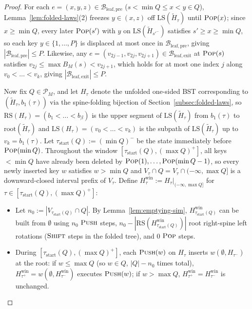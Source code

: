 \documentclass[11pt]{article}
\theoremstyle{definition}
\theoremstyle{remark}
\newcommand{\LS}{\mathrm{LS}}
\newcommand{\RS}{\mathrm{RS}}
\newcommand{\PUSH}{\textnormal{\scshape Push}}
\newcommand{\POP}{\textnormal{\scshape Pop}}
\newcommand{\SHIFT}{\textnormal{\scshape Shift}}
\begin{document}
\begin{proof}
For each $e = (x, y, z) \in \mathcal{B}_{\mathrm{leaf,pre}}$ ($s < \min Q \le x < y \in Q$), Lemma~\ref{lem:folded-laws}(2) freezes $y \in (x, z)$ off $\LS(\widetilde{H}_\tau)$ until $\POP(x)$; since $x \ge \min Q$, every later $\POP(s')$ with $y$ on $\LS(\widetilde{H}_{s'^-})$ satisfies $s' \ge x \ge \min Q$, so each key $y \in \{1, \dots, P\}$ is displaced at most once in $\mathcal{B}_{\mathrm{leaf,pre}}$, giving $|\mathcal{B}_{\mathrm{leaf,pre}}| \le P$. Likewise, any $e = (v_{2j-1}, v_{2j}, v_{2j+1}) \in \mathcal{B}_{\mathrm{leaf,exit}}$ at $\POP(s)$ satisfies $v_{2j} \le \max B_M(s) < v_{2j+1}$, which holds for at most one index $j$ along $v_0 < \dots < v_k$, giving $|\mathcal{B}_{\mathrm{leaf,exit}}| \le P$.

Now fix $Q \in \mathcal{P}_M$, and let $H_\tau$ denote the unfolded one-sided BST corresponding to $(\widetilde{H}_\tau, b_1(\tau))$ via the spine-folding bijection of Section~\ref{subsec:folded-laws}, so $\RS(H_\tau) = (b_1 < \dots < b_\beta)$ is the upper segment of $\LS(\widetilde{H}_\tau)$ from $b_1(\tau)$ to $\mathrm{root}(\widetilde{H}_\tau)$ and $\LS(H_\tau) = (v_0 < \dots < v_k)$ is the subpath of $\LS(\widetilde{H}_\tau)$ up to $v_k = b_1(\tau)$. Let $\tau_{\mathrm{start}}(Q) := (\min Q)^-$ be the state immediately before $\POP(\min Q)$. Throughout the window $[\tau_{\mathrm{start}}(Q), (\max Q)^+]$, all keys $< \min Q$ have already been deleted by $\POP(1), \dots, \POP(\min Q - 1)$, so every newly inserted key $w$ satisfies $w > \min Q$ and $V_\tau \cap Q = V_\tau \cap (-\infty, \max Q]$ is a downward-closed interval prefix of $V_\tau$. Define $H_\tau^{\mathrm{win}} := H_\tau|_{(-\infty, \max Q]}$ for $\tau \in [\tau_{\mathrm{start}}(Q), (\max Q)^+]$:
\begin{itemize}[leftmargin=2em]
  \item Let $n_0 := |V_{\tau_{\mathrm{start}}(Q)} \cap Q|$. By Lemma~\ref{lem:emptying-sim}, $H_{\tau_{\mathrm{start}}(Q)}^{\mathrm{win}}$ can be built from $\emptyset$ using $n_0$ $\PUSH$ steps, $n_0 - |\RS(H_{\tau_{\mathrm{start}}(Q)}^{\mathrm{win}})|$ root right-spine left rotations ($\SHIFT$ steps in the folded tree), and $0$ $\POP$ steps.
  \item During $[\tau_{\mathrm{start}}(Q), (\max Q)^+]$, each $\PUSH(w)$ on $H_\tau$ inserts $w(\emptyset, H_{\tau^-})$ at the root: if $w \le \max Q$ (so $w \in Q$, $|Q| - n_0$ times total), $H_{\tau^+}^{\mathrm{win}} = w(\emptyset, H_{\tau^-}^{\mathrm{win}})$ executes $\PUSH(w)$; if $w > \max Q$, $H_{\tau^+}^{\mathrm{win}} = H_{\tau^-}^{\mathrm{win}}$ is unchanged.

\end{itemize}
\end{proof}
\end{document}
